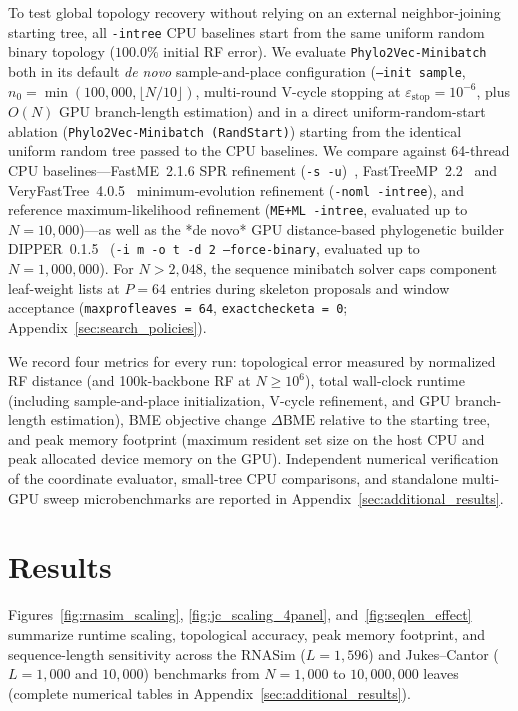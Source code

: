 \documentclass[11pt,a4paper]{article}
\makeatletter
\DeclareRobustCommand{\_}{\ifmmode\nfss@text{\textunderscore}\else\textunderscore\allowbreak\fi}
\theoremstyle{definition}
\makeatother
\begin{document}
To test global topology recovery without relying on an external neighbor-joining starting tree, all \texttt{-intree} CPU baselines start from the same uniform random binary topology ($100.0\%$ initial RF error).
We evaluate \texttt{Phylo2Vec-Minibatch} both in its default \textit{de novo} sample-and-place configuration (\texttt{--init sample}, $n_0=\min(100{,}000,\lfloor N/10\rfloor)$, multi-round V-cycle stopping at $\varepsilon_{\mathrm{stop}}=10^{-6}$, plus $O(N)$ GPU branch-length estimation) and in a direct uniform-random-start ablation (\texttt{Phylo2Vec-Minibatch (RandStart)}) starting from the identical uniform random tree passed to the CPU baselines.
We compare against 64-thread CPU baselines---FastME~2.1.6 SPR refinement (\texttt{-s -u})~\cite{lefort2015fastme}, FastTreeMP~2.2~\cite{price2010fasttree} and VeryFastTree~4.0.5~\cite{pineiro2020veryfasttree} minimum-evolution refinement (\texttt{-noml -intree}), and reference maximum-likelihood refinement (\texttt{ME+ML -intree}, evaluated up to $N=10{,}000$)---as well as the *de novo* GPU distance-based phylogenetic builder DIPPER~0.1.5~\cite{walia2026dipper} (\texttt{-i m -o t -d 2 --force-binary}, evaluated up to $N=1{,}000{,}000$).
For $N>2{,}048$, the sequence minibatch solver caps component leaf-weight lists at $P=64$ entries during skeleton proposals and window acceptance (\texttt{max\_prof\_leaves = 64}, \texttt{exact\_check\_eta = 0}; Appendix~\ref{sec:search_policies}).

We record four metrics for every run: topological error measured by normalized RF distance (and 100k-backbone RF at $N\ge 10^6$), total wall-clock runtime (including sample-and-place initialization, V-cycle refinement, and GPU branch-length estimation), BME objective change $\Delta\text{BME}$ relative to the starting tree, and peak memory footprint (maximum resident set size on the host CPU and peak allocated device memory on the GPU).
Independent numerical verification of the coordinate evaluator, small-tree CPU comparisons, and standalone multi-GPU sweep microbenchmarks are reported in Appendix~\ref{sec:additional_results}.

\section{Results}
\label{sec:results}

Figures~\ref{fig:rnasim_scaling}, \ref{fig:jc_scaling_4panel}, and~\ref{fig:seqlen_effect} summarize runtime scaling, topological accuracy, peak memory footprint, and sequence-length sensitivity across the RNASim ($L=1{,}596$) and Jukes--Cantor ($L=1{,}000$ and $10{,}000$) benchmarks from $N=1{,}000$ to $10{,}000{,}000$ leaves (complete numerical tables in Appendix~\ref{sec:additional_results}).
\end{document}
